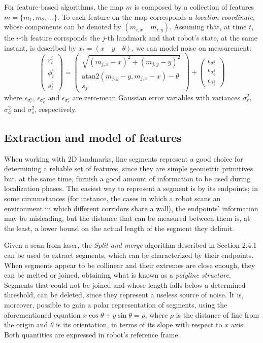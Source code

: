 \documentclass[a4paper, onecolumn]{report}
\begin{document}
For feature-based algorithms, the map $m$ is composed by a collection of features $m = \{m_1, m_2, \dots \}$. To each feature on the map corresponds a \emph{location coordinate}, whose components can be denoted by $(m_{i,x} \quad m_{i,y})$. Assuming that, at time $t$, the $i$-th feature corrsponds the $j$-th landmark and that robot's state, at the same instant, is described by $x_t = (x \quad y \quad \theta)$, we can model noise on measurement:
\begin{equation}
	\left(\begin{matrix} r_t^i \\ \phi_t^i \\ s_t^i	\end{matrix} \right) = \left( \begin{matrix} \sqrt{(m_{j,x} - x)^2 + (m_{j,y} - y)^2} \\ \mbox{atan2}(m_{j,y} - y, m_{j,x}-x) - \theta \\ s_j\end{matrix}\right) + \left( \begin{matrix}\epsilon_{\sigma_r^2} \\ \epsilon_{\sigma_{\phi}^2} \\ \epsilon_{\sigma_s^2}\end{matrix}\right)
\end{equation}
where $\epsilon_{\sigma_r^2}$, $\epsilon_{\sigma_\phi^2}$ and $\epsilon_{\sigma_s^2}$ are zero-mean Gaussian error variables with variances $\sigma_r^2$, $\sigma_\phi^2$ and $\sigma_s^2$, respectively.

\subsection{Extraction and model of features}
When working with 2D landmarks, line segments represent a good choice for determining a reliable set of features, since they are simple geometric primitives but, at the same time, furnish a good amount of information to be used during localization phases. The easiest way to represent a segment is by its endpoints; in some circumstances (for instance, the cases in which a robot scans an environment in which different corridors share a wall), the endpoints' information may be misleading, but the distance that can be measured between them is, at the least, a lower bound on the actual length of the segment they delimit.

Given a scan from laser, the \emph{Split and merge} algorithm described in Section 2.4.1 can be used to extract segments, which can be characterized by their endpoints. When segments appear to be collinear and their extremes are close enough, they can be melted or joined, obtaining what is known as a \emph{polyline structure}. Segments that could not be joined and whose length falls below a determined threshold, can be deleted, since they represent a useless source of noise. It is, moreover, possible to gain a polar representation of segments, using the aforementioned equation $x\cos \theta + y\sin\theta = \rho$, where $\rho$ is the distance of line from the origin and $\theta$ is its orientation, in terms of its slope with respect to $x$ axis. Both quantities are expressed in robot's reference frame.
\end{document}
